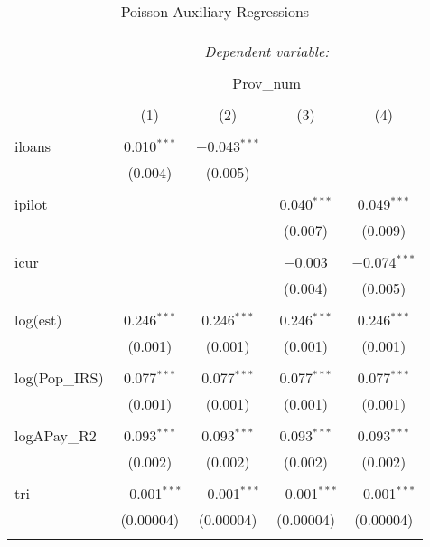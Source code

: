 
\begin{table}[!htbp] \centering 
  \caption{Poisson Auxiliary Regressions} 
  \label{} 
\begin{tabular}{@{\extracolsep{5pt}}lcccc} 
\\[-1.8ex]\hline 
\hline \\[-1.8ex] 
 & \multicolumn{4}{c}{\textit{Dependent variable:}} \\ 
\cline{2-5} 
\\[-1.8ex] & \multicolumn{4}{c}{Prov\_num} \\ 
\\[-1.8ex] & (1) & (2) & (3) & (4)\\ 
\hline \\[-1.8ex] 
 iloans & 0.010$^{***}$ & $-$0.043$^{***}$ &  &  \\ 
  & (0.004) & (0.005) &  &  \\ 
  & & & & \\ 
 ipilot &  &  & 0.040$^{***}$ & 0.049$^{***}$ \\ 
  &  &  & (0.007) & (0.009) \\ 
  & & & & \\ 
 icur &  &  & $-$0.003 & $-$0.074$^{***}$ \\ 
  &  &  & (0.004) & (0.005) \\ 
  & & & & \\ 
 log(est) & 0.246$^{***}$ & 0.246$^{***}$ & 0.246$^{***}$ & 0.246$^{***}$ \\ 
  & (0.001) & (0.001) & (0.001) & (0.001) \\ 
  & & & & \\ 
 log(Pop\_IRS) & 0.077$^{***}$ & 0.077$^{***}$ & 0.077$^{***}$ & 0.077$^{***}$ \\ 
  & (0.001) & (0.001) & (0.001) & (0.001) \\ 
  & & & & \\ 
 logAPay\_R2 & 0.093$^{***}$ & 0.093$^{***}$ & 0.093$^{***}$ & 0.093$^{***}$ \\ 
  & (0.002) & (0.002) & (0.002) & (0.002) \\ 
  & & & & \\ 
 tri & $-$0.001$^{***}$ & $-$0.001$^{***}$ & $-$0.001$^{***}$ & $-$0.001$^{***}$ \\ 
  & (0.00004) & (0.00004) & (0.00004) & (0.00004) \\ 
  & & & & \\ 

\end{tabular}
\end{table}
